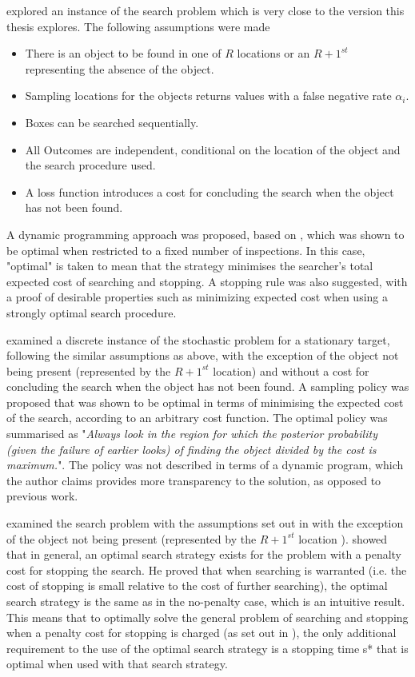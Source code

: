 \cite{Chew1966AProcedure} explored an instance of the search problem which is very close to the version this thesis explores. The following assumptions were made
\begin{itemize}
    \item There is an object to be found in one of $R$ locations or an $R+1^{st}$ representing the absence of the object.
    \item Sampling locations for the objects returns values with a false negative rate $\alpha_i$.
    \item Boxes can be searched sequentially.
    \item All Outcomes are independent, conditional on the location of the object and the search procedure used.
    \item A loss function introduces a cost for concluding the search when the object has not been found.
\end{itemize}
A dynamic programming approach was proposed, based on \cite{Blackwell1961DiscreteProgramming}, which was shown to be optimal when restricted to a fixed number of inspections. In this case, "optimal" is taken to mean that the strategy minimises the searcher's total expected cost of searching and stopping. A stopping rule was also suggested, with a proof of desirable properties such as minimizing expected cost when using a strongly optimal search procedure.

\cite{Black1965DiscretePROBLEM} examined a discrete instance of the stochastic problem for a stationary target, following the similar assumptions as \cite{Chew1966AProcedure} above, with the exception of the object not being present (represented by the $R+1^{st}$ location) and without a cost for concluding the search when the object has not been found. A sampling policy was proposed that was shown to be optimal in terms of minimising the expected cost of the search, according to an arbitrary cost function. The optimal policy was summarised as "\textit{Always look in the region for which the posterior probability (given the failure of earlier looks) of finding the object divided by the cost is maximum.}". The policy was not described in terms of a dynamic program, which the author claims provides more transparency to the solution, as opposed to previous work.

\cite{Ross1969AStop} examined the search problem with the assumptions set out in \cite{Chew1966AProcedure} with the exception of the object not being present (represented by the $R+1^{st}$ location ). \cite{Ross1969AStop} showed that in general, an optimal search strategy exists for the problem with a penalty cost for stopping the search. He proved that when searching is warranted (i.e. the cost of stopping is small relative to the cost of further searching), the optimal search strategy is the same as in the no-penalty case, which is an intuitive result. This means that to optimally solve the general problem of searching and stopping when a penalty cost for stopping is charged (as set out in \cite{Chew1966AProcedure}), the only additional requirement to the use of the optimal search strategy is a stopping time s* that is optimal when used with that search strategy.

